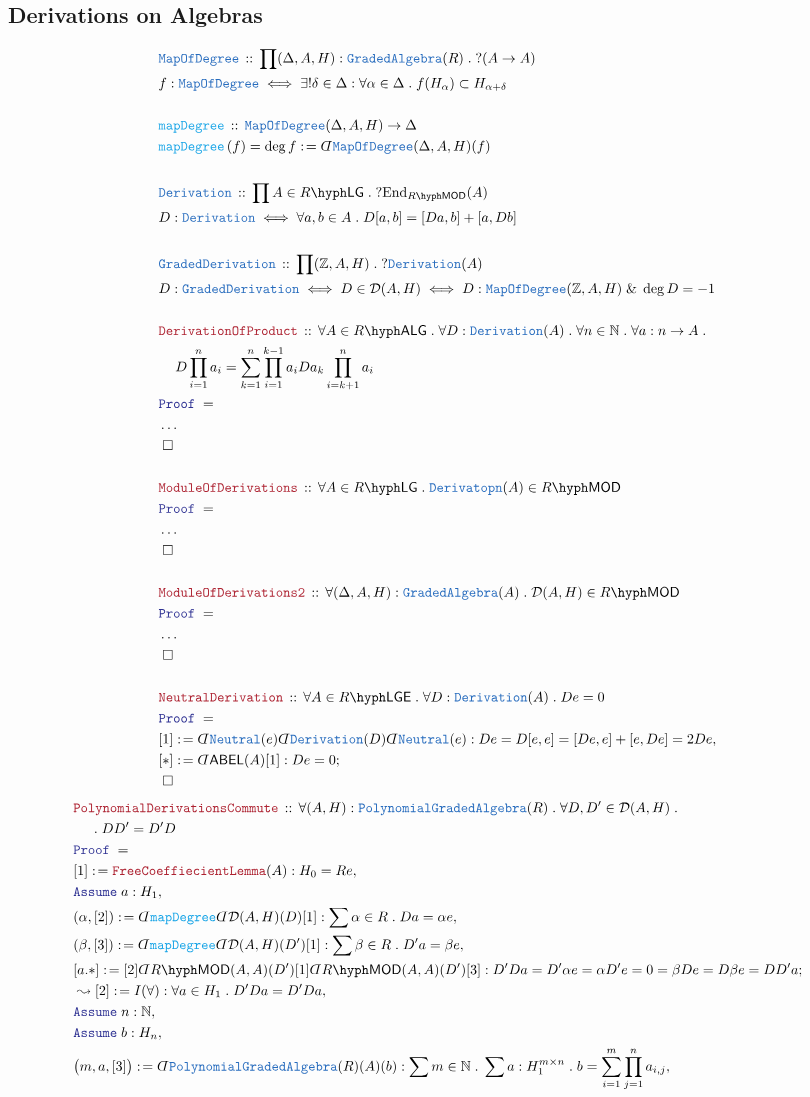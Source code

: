 \documentclass[12pt]{scrartcl}%
\newcommand{\TYPE}[1]{\textcolor{NavyBlue}{\mathtt{#1}}}%
\newcommand{\FUNC}[1]{\textcolor{Cerulean}{\mathtt{#1}}}%
\newcommand{\LOGIC}[1]{\textcolor{Blue}{\mathtt{#1}}}%
\newcommand{\THM}[1]{\textcolor{Maroon}{\mathtt{#1}}}%
\renewcommand{\.}{\; . \;} %
\newcommand{\de}{: \kern 0.1pc =} %
\newcommand{\Act}[1]{\left( #1 \right)} %
\newcommand{\Theorem}[2]{& \THM{#1} \, :: \, #2 \\ & \Proof = \\ } %
\newcommand{\DeclareType}[2]{& \TYPE{#1} \, :: \, #2 \\}%
\newcommand{\DefineType}[3]{& #1 : \TYPE{#2} \iff #3 \\}%
\newcommand{\DefineNamedType}[4]{& #1 : \TYPE{#2} \iff #3 \iff #4 \\}%
\newcommand{\DeclareFunc}[2]{& \FUNC{#1} \, :: \, #2 \\}%
\newcommand{\DefineNamedFunc}[4]{&  \FUNC{#1}\Act{#2} = #3 \de #4 \\}%
\newcommand{\NewLine}{\\ & \kern 1pc}%
\newcommand{\Page}[1]{ \begin{align*} #1 \end{align*}  }%
\newcommand{ \bd }{ \ByDef }%
\newcommand{\NoProof}{ & \ldots \\ \EndProof}%
\renewcommand{\And}{\; \& \;}%
\newcommand{\Int}{\mathbb{Z}}%
\newcommand{\Nat}{\mathbb{N}}%
\newcommand{\End}{\mathrm{End}}%
\newcommand{\Say}[3]{& #1 \de #2 : #3, \\} %
\newcommand{\Conclude}[3]{& #1 \de #2 : #3; \\}%
\newcommand{\Derive}[3]{& \leadsto #1 \de #2 : #3, \\} %
\newcommand{\Assume}[2]{& \LOGIC{Assume} \; #1 : #2, \\} %
\newcommand{\QED}{\; \square} %
\newcommand{\EndProof}{& \QED \\} %
\newcommand{\ByDef}{\rotatebox[origin=c]{-180}{$D$}}%
\newcommand{\Proof}{\LOGIC{Proof} \; } %
\newcommand{\D}{\mathcal{D}}
\newcommand{\ABEL}{\mathsf{ABEL}} %
\newcommand{\LMOD}[1]{#1\hyph\mathsf{MOD}} %
\newcommand{\LALG}[1]{#1\hyph\mathsf{ALG}}%
\newcommand{\LLGE}[1]{#1\hyph\mathsf{LGE}}%
\newcommand{\LLG}[1]{#1\hyph\mathsf{LG}}%
\newcommand{\PGA}{\TYPE{PolynomialGradedAlgebra}}
\begin{document}
\subsection{Derivations on Algebras}
\Page
{
	\DeclareType{MapOfDegree}{\prod (\Delta,A,H) : \TYPE{GradedAlgebra}(R) \. ?(A \to A)}
	\DefineType{f}{MapOfDegree}{\exists! \delta \in \Delta : \forall \alpha \in \Delta \. f(H_\alpha) \subset H_{\alpha + \delta}}
	\\
	\DeclareFunc{mapDegree}{\TYPE{MapOfDegree}(\Delta,A,H) \to \Delta }
	\DefineNamedFunc{mapDegree}{f}{\deg f}{\bd \TYPE{MapOfDegree}(\Delta,A,H)(f)}
	\\
	\DeclareType{Derivation}{\prod A \in \LLG{R} \. ?\End_{\LMOD{R}}(A)}
	\DefineType{D}{Derivation}{ \forall a,b \in A \.  D[a,b] = [Da,b] + [a,Db]  }
	\\
	\DeclareType{GradedDerivation}{\prod (\Int,A,H) \. ?\TYPE{Derivation}(A)}
	\DefineNamedType{D}{GradedDerivation}{D \in \mathcal{D}(A,H) }{ D : \TYPE{MapOfDegree}(\Int,A,H) \And \deg D = -1 }
	\\
	\Theorem{DerivationOfProduct}{\forall A \in \LALG{R} \. \forall D : \TYPE{Derivation}(A) \. \forall n \in \Nat \. \forall a : n \to A \. 
		 \NewLine D \prod^n_{i=1} a_i = \sum^n_{k=1} \prod^{k-1}_{i=1} a_i D a_k \prod^{n}_{i=k+1} a_i}
	\NoProof
	\\
	\Theorem{ModuleOfDerivations}{\forall A \in \LLG{R} \. \TYPE{Derivatopn}(A) \in \LMOD{R}}
	\NoProof
	\\
	\Theorem{ModuleOfDerivations2}{\forall (\Delta,A,H) : \TYPE{GradedAlgebra}(A) \. \D(A,H) \in \LMOD{R}  }
	\NoProof
	\\
	\Theorem{NeutralDerivation}{\forall A \in \LLGE{R} \. \forall D : \TYPE{Derivation}(A) \. De = 0}
	\Say{[1]}{\bd \TYPE{Neutral}(e)\bd \TYPE{Derivation}(D)\bd \TYPE{Neutral}(e)}{De = D[e,e] = [De,e] + [e,De] = 2De}
	\Conclude{[*]}{\bd \ABEL(A)[1]}{De = 0 }
	\EndProof
}\Page{
	\Theorem{PolynomialDerivationsCommute}{\forall (A,H) : \PGA(R) \. \forall D,D' \in \D(A,H) \.  \NewLine \. DD' = D'D }
	\Say{[1]}{\THM{FreeCoeffiecientLemma}(A)}{H_0 = Re}
	\Assume{a}{H_1}
	\Say{(\alpha,[2])}{\bd \FUNC{mapDegree}\bd \D(A,H)(D)[1]}{\sum \alpha \in R \. Da = \alpha e}
	\Say{(\beta,[3])}{\bd \FUNC{mapDegree}\bd \D(A,H)(D')[1]}{\sum \beta \in R \. D'a = \beta e}
	\Conclude{[a.*]}{[2] \bd \LMOD{R}(A,A)(D')  [1] \bd \LMOD{R}(A,A)(D') [3]}{ D'Da = D' \alpha e = \alpha D' e = 0 = \beta D e = D \beta e = DD'a }
	\Derive{[2]}{I(\forall)}{\forall a \in H_1 \. D'Da = D'Da}
	\Assume{n}{\Nat}
	\Assume{b}{H_n}
	\Say{\big(m,a,[3]\big)}{\bd \PGA(R)(A)(b)}{\sum m \in \Nat \. \sum  a :  H_1^{m \times n} \. b = \sum^m_{i=1} \prod^n_{j=1} a_{i,j} }
}
\end{document}

